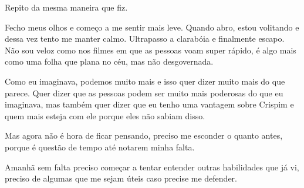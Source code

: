 Repito da mesma maneira que fiz.

Fecho meus olhos e começo a me sentir mais leve. Quando abro, estou volitando e dessa vez tento me manter calmo. Ultrapasso a clarabóia e finalmente escapo. Não sou veloz como nos filmes em que as pessoas voam super rápido, é algo mais como uma folha que plana no céu, mas não desgovernada.

Como eu imaginava, podemos muito mais e isso quer dizer muito mais do que parece. Quer dizer que as pessoas podem ser muito mais poderosas do que eu imaginava, mas também quer dizer que eu tenho uma vantagem sobre Crispim e quem mais esteja com ele porque eles não sabiam disso.

Mas agora não é hora de ficar pensando, preciso me esconder o quanto antes, porque é questão de tempo até notarem minha falta.

Amanhã sem falta preciso começar a tentar entender outras habilidades que já vi, preciso de algumas que me sejam úteis caso precise me defender.








